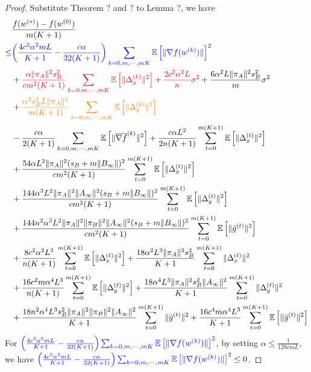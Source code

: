 \documentclass{article}
\newcommand{\EE}[1]{\mathbb{E}\left[#1\right]}
\newcommand{\norm}[1]{\| #1 \|}
\begin{document}
\begin{proof}
  Substitute Theorem ? and ? to Lemma ?, we have
  \begin{align*}
    &\frac{f(w^{(*)})-f(w^{(0)})}{m(K+1)}
  \\\leq& \textcolor{blue}{\left(\frac{4c^2\alpha^2mL}{K+1}-\frac{c\alpha}{32(K+1)}\right)\sum_{k=0,m,\cdots,mK}\EE{\norm{\nabla f(w^{(k)})}}^2}\\&+\textcolor{red}{\frac{\alpha\norm{\pi_A}^2s_B^2}{cm^2(K+1)}\sum_{k=0,m,\cdots,mK}\EE{\norm{\Delta_y^{(k)}}^2}}+\textcolor{red}{ \frac{2c^2\alpha^2L}{n}\sigma^2}+\frac{6\alpha^2L\norm{\pi_A}^2s_B^2}{m}\sigma^2\\&+\textcolor{orange}{\frac{\alpha^2s_B^2L\norm{\pi_A}^2}{m(K+1)}\sum_{k=0,m,\cdots,mK}\EE{\norm{\Delta_y^{(k)}}^2}}\\&-\frac{c\alpha }{2(K+1)}\sum_{k=0,m,\cdots,mK}\EE{\norm{\overline{\nabla f}^{(k)}}^2}+\frac{c\alpha L^2}{2n(K+1)}\sum_{t=0}^{m(K+1)}\EE{\norm{\Delta_x^{(t)}}^2}\\&+\frac{54\alpha L^2\norm{\pi_A}^2(s_B+m\norm{B_{\infty}})^2}{cm^2(K+1)}\sum_{t=0}^{m(K+1)}\EE{\norm{\Delta_x^{(t)}}^2}\\&+\frac{144\alpha^3L^2\norm{\pi_A}^2\norm{A_{\infty}}^2(s_B+m\norm{B_{\infty}})^2}{cm^2(K+1)}\sum_{t=0}^{m(K+1)}\EE{\norm{\Delta_y^{(t)}}^2}
    \\&+\frac{144n^2\alpha^3L^2\norm{\pi_A}^2\norm{\pi_B}^2\norm{A_{\infty}}^2(s_B+m\norm{B_{\infty}})^2}{cm^2(K+1)}\sum_{t=0}^{m(K+1)}\EE{\norm{\bar{g}^{(t)}}^2}\\&+\frac{8c^2\alpha^2L^3}{n(K+1)}\sum_{t=0}^{m(K+1)}\EE{\norm{\Delta_x^{(t)}}^2}+\frac{18\alpha^2L^3\norm{\pi_A}^2s_B^2}{ K+1}\sum_{t=0}^{m(K+1)}\norm{\Delta_x^{(t)}}^2\\&+\frac{16c^2m\alpha^4L^3}{n(K+1)}\sum_{t=0}^{m(K+1)}\EE{\norm{\Delta_y^{(t)}}^2}+\frac{18\alpha^4L^3\norm{\pi_A}^2s_B^2\norm{A_{\infty}}^2}{ K+1}\sum_{t=0}^{m(K+1)}\norm{\Delta_y^{(t)}}^2
    \\&+\frac{18n^2\alpha^4L^3s_B^2\norm{\pi_A}^2\norm{\pi_B}^2\norm{A_{\infty}}^2}{ K+1}\sum_{t=0}^{m(K+1)}\norm{\bar{g}^{(t)}}^2+\frac{16c^4m\alpha^4L^3}{K+1}\sum_{t=0}^{m(K+1)}\EE{\norm{\bar{g}^{(t)}}^2}
  \end{align*}
  For $\textcolor{blue}{\left(\frac{4c^2\alpha^2mL}{K+1}-\frac{c\alpha}{32(K+1)}\right)\sum_{k=0,m,\cdots,mK}\EE{\norm{\nabla f(w^{(k)})}}^2}$, by setting $\alpha \leq \frac{1}{128cmL}$, we have $\textcolor{blue}{\left(\frac{4c^2\alpha^2mL}{K+1}-\frac{c\alpha}{32(K+1)}\right)\sum_{k=0,m,\cdots,mK}\EE{\norm{\nabla f(w^{(k)})}}^2}\leq 0$.


\end{proof}
\end{document}
